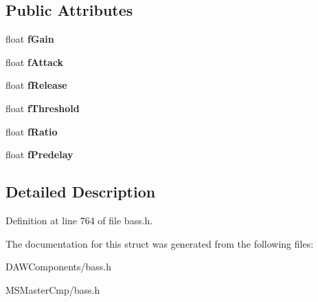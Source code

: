 \subsection*{Public Attributes}
\begin{DoxyCompactItemize}
\item 
\hypertarget{struct_b_a_s_s___d_x8___c_o_m_p_r_e_s_s_o_r_a9d35e7c7ad2df73b081f31ceee1defcc_a9d35e7c7ad2df73b081f31ceee1defcc}{float {\bfseries f\-Gain}}\label{struct_b_a_s_s___d_x8___c_o_m_p_r_e_s_s_o_r_a9d35e7c7ad2df73b081f31ceee1defcc_a9d35e7c7ad2df73b081f31ceee1defcc}

\item 
\hypertarget{struct_b_a_s_s___d_x8___c_o_m_p_r_e_s_s_o_r_a7ad66e4cd902035feff1050abeaf7f35_a7ad66e4cd902035feff1050abeaf7f35}{float {\bfseries f\-Attack}}\label{struct_b_a_s_s___d_x8___c_o_m_p_r_e_s_s_o_r_a7ad66e4cd902035feff1050abeaf7f35_a7ad66e4cd902035feff1050abeaf7f35}

\item 
\hypertarget{struct_b_a_s_s___d_x8___c_o_m_p_r_e_s_s_o_r_a342f2aac54617c7cedb1cef24e504859_a342f2aac54617c7cedb1cef24e504859}{float {\bfseries f\-Release}}\label{struct_b_a_s_s___d_x8___c_o_m_p_r_e_s_s_o_r_a342f2aac54617c7cedb1cef24e504859_a342f2aac54617c7cedb1cef24e504859}

\item 
\hypertarget{struct_b_a_s_s___d_x8___c_o_m_p_r_e_s_s_o_r_a16e3551549e24df55d0f97cb7d67f048_a16e3551549e24df55d0f97cb7d67f048}{float {\bfseries f\-Threshold}}\label{struct_b_a_s_s___d_x8___c_o_m_p_r_e_s_s_o_r_a16e3551549e24df55d0f97cb7d67f048_a16e3551549e24df55d0f97cb7d67f048}

\item 
\hypertarget{struct_b_a_s_s___d_x8___c_o_m_p_r_e_s_s_o_r_adb827cf9d2693779c096cf22761ace59_adb827cf9d2693779c096cf22761ace59}{float {\bfseries f\-Ratio}}\label{struct_b_a_s_s___d_x8___c_o_m_p_r_e_s_s_o_r_adb827cf9d2693779c096cf22761ace59_adb827cf9d2693779c096cf22761ace59}

\item 
\hypertarget{struct_b_a_s_s___d_x8___c_o_m_p_r_e_s_s_o_r_adeacc7ea3f0433fc478b91943a0a695d_adeacc7ea3f0433fc478b91943a0a695d}{float {\bfseries f\-Predelay}}\label{struct_b_a_s_s___d_x8___c_o_m_p_r_e_s_s_o_r_adeacc7ea3f0433fc478b91943a0a695d_adeacc7ea3f0433fc478b91943a0a695d}

\end{DoxyCompactItemize}


\subsection{Detailed Description}


Definition at line 764 of file bass.\-h.



The documentation for this struct was generated from the following files\-:\begin{DoxyCompactItemize}
\item 
D\-A\-W\-Components/bass.\-h\item 
M\-S\-Master\-Cmp/bass.\-h\end{DoxyCompactItemize}

